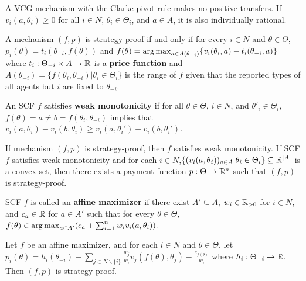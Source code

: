 \begin{thm}
  \label{sec:mech-with-paym-5}
  A VCG mechanism with the Clarke pivot rule makes no positive
  transfers.  If $v_{i}(a, \theta_{i}) \geq 0$ for all $i \in N$,
  $\theta_{i} \in \Theta_{i}$, and $a \in A$, it is also individually rational.
\end{thm}

\begin{thm}
  \label{sec:mech-with-paym-6}
  A mechanism $(f, p)$ is strategy-proof if and only if for every $i
  \in N$ and $\theta \in \Theta$, $p_{i}(\theta) = t_{i}(\theta_{-i},
  f(\theta))$ and $f(\theta) = \operatorname*{arg\,max}_{a \in A(\theta_{-i})} \{
  v_{i}(\theta_{i}, a) - t_{i}(\theta_{-i}, a) \} $ where $t_{i}:
  \Theta_{-i} \times A \rightarrow \mathbb{R}$ is a \textbf{price function}
  and $A(\theta_{-i}) = \{ f(\theta_{i}, \theta_{-i}) | \theta_{i} \in
  \Theta_{i}\} $ is the range of $f$ given that  the reported types
  of all agents but $i$ are fixed to $\theta_{-i}$.
\end{thm}

\begin{defn}
  \label{sec:mech-with-paym-7}
  An SCF $f$ satisfies \textbf{weak monotonicity} if for all $\theta
  \in \Theta$, $i \in N$, and $\theta'_{i} \in \Theta_{i}$, $f(\theta)
  = a \neq b = f(\theta_{i}, \theta_{-i})$ implies that $v_{i}(a,
  \theta_{i}) - v_{i}(b, \theta_{i}) \geq v_{i}(a, \theta_{i}') -
  v_{i}(b, \theta_{i}')$.
\end{defn}

\begin{thm}
  \label{sec:mech-with-paym-8}
  If mechanism $(f, p)$ is strategy-proof, then $f$ satisfies weak
  monotonicity.  If SCF $f$ satisfies weak monotonicity and for each
  $i \in N$,$ \{ (v_i(a, \theta{_i}))_{a \in A} | \theta_{i} \in
  \Theta_{i} \} \subseteq \mathbb{R}^{|A|}$  is a convex set, then there
  exists a payment function $p: \Theta \rightarrow \mathbb{R}^{n}$ such that
  $(f, p)$ is strategy-proof.
\end{thm}

\begin{defn}
  \label{sec:mech-with-paym-9}
  SCF $f$ is called an \textbf{affine maximizer} if there exist $A'
  \subseteq A$, $w_{i} \in \mathbb{R}_{> 0}$ for $i \in N$, and $c_{a} \in \mathbb{R}$
  for $a \in A'$ such that for every $\theta \in \Theta$, $f(\theta)
  \in \operatorname*{arg\,max}_{a \in A'}(c_{a} + \sum_{i=1}^{n} w_{i} v_{i}(a,
  \theta_{i}))$.
\end{defn}

\begin{thm}
  \label{sec:mech-with-paym-10}
  Let $f$ be an affine maximizer, and for each $i \in N$ and $\theta
  \in \Theta$, let $p_{i}(\theta) = h_{i}(\theta_{-i}) - \sum_{j \in N
  \backslash \{ i \} }^{} \frac{w_{j}}{w_{i}} v_{j}(f(\theta),
\theta_{j}) - \frac{c_{f(\theta)}}{w_{i}}$ where $h_{i}: \Theta_{-i}
\rightarrow \mathbb{R}$.  Then $(f, p)$ is strategy-proof.
\end{thm}

